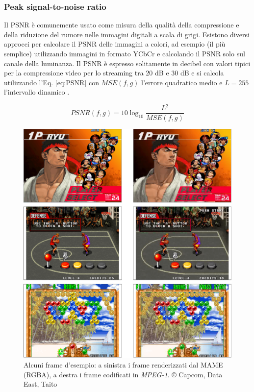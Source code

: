 \subsubsection{Peak signal-to-noise ratio}
Il PSNR è comunemente usato come misura della qualità della compressione e della riduzione del rumore nelle immagini digitali a scala di grigi. Esistono diversi approcci per calcolare il PSNR delle immagini a colori, ad esempio (il più semplice) utilizzando immagini in formato YCbCr e calcolando il PSNR solo sul canale della luminanza. Il PSNR è espresso solitamente in decibel con valori tipici per la compressione video per lo streaming tra $20$ \si{dB} e $30$ \si{dB} \parencite{ThomosN2006OtoJ} e si calcola utilizzando l'Eq. \ref{eq:PSNR} con $MSE(f,g)$ l'errore quadratico medio e $L = 255$ l'intervallo dinamico \parencite{AnewcombinedPSNRforobjectivevideoqualityassessment}.

\begin{equation} \label{eq:PSNR}
	PSNR(f,g)=10 \log_{10}  \frac{L^2}{MSE(f,g)}	
\end{equation}

\begin{figure}[H]
	\centering
	\includegraphics[width=\linewidth]{immagini/BMP_MPEG_compare}
	\caption{Alcuni frame d'esempio: a sinistra i frame renderizzati dal MAME (RGBA), a destra i frame codificati in \textit{MPEG-1}. © Capcom, Data East, Taito}
	\label{fig:BMP_MPEG_compare}
\end{figure}



